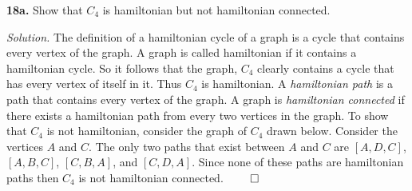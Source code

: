 \documentclass{article}
\begin{document}
\vspace{6mm}

\textbf{18a.} Show that \(C_4\) is hamiltonian but not hamiltonian connected. 

\vspace{3mm}
\textit{Solution.} The definition of a hamiltonian cycle of a graph is a cycle that contains every vertex of the graph. A graph is called hamiltonian if it contains a hamiltonian cycle. So it follows that the graph, \(C_4\) clearly contains a cycle that has every vertex of itself in it. Thus \(C_4\) is hamiltonian. A \emph{hamiltonian path} is a path that contains every vertex of the graph. A graph is \emph{hamiltonian connected} if there exists a hamiltonian path from every two vertices in the graph. To show that \(C_4\) is not hamiltonian, consider the graph of \(C_4\) drawn below. Consider the vertices \(A\) and \(C\). The only two paths that exist between \(A\) and \(C\) are \( [A,D,C]\), \([A,B,C]\), \([C,B,A]\), and \([C,D,A]\). Since none of these paths are hamiltonian paths then \(C_4\) is not hamiltonian connected.  \(\qed\)

\begin{center}
\end{center}
\end{document}
